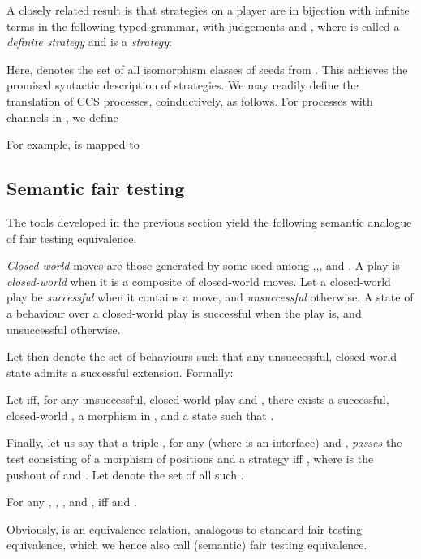 \documentclass{LMCS}
\theoremstyle{plain}\newtheorem{satz}[thm]{Satz}
\begin{document}
A closely related result is that strategies on a player  are in
bijection with infinite terms in the following typed grammar, with
judgements  and , where  is called a
\emph{definite strategy} and  is a \emph{strategy}:
Here,  denotes the set of all isomorphism classes of seeds
from .  This achieves the promised syntactic description of
strategies. We may readily define the translation of CCS processes,
coinductively, as follows. For processes with channels in , we
define

For example,  is mapped to



\subsection{Semantic fair testing}\label{subsec:fair}
The tools developed in the previous section yield the following
semantic analogue of fair testing equivalence.
\begin{defi}\label{def:cw:successful}
  \emph{Closed-world} moves are those generated by some seed among
  ,,, and . A play is
  \emph{closed-world} when it is a composite of closed-world moves.
  Let a closed-world play be \emph{successful} when it contains a
   move, and \emph{unsuccessful} otherwise. A state  of a behaviour  over a closed-world play
   is successful when the play  is, and unsuccessful
  otherwise.
\end{defi}

Let then  denote the set of behaviours  such that any unsuccessful, closed-world state admits a
successful extension.  Formally:
\begin{defi}\label{def:bbotccs}
  Let  iff, for any unsuccessful, closed-world play  and , there exists a successful,
  closed-world , a morphism  in , and a state
   such that .
\end{defi}
Finally, let us say
that a triple , for any  (where  is an
interface) and , \emph{passes} the test
consisting of a morphism  of positions and a
strategy  iff , where 
is the pushout of  and .  Let  denote the set of
all such .
\begin{defi}
  For any , , , and
  ,  iff  and
  .
\end{defi}
Obviously,  is an equivalence relation, analogous to standard fair
testing equivalence, which we hence also call (semantic) fair testing
equivalence.
\end{document}
